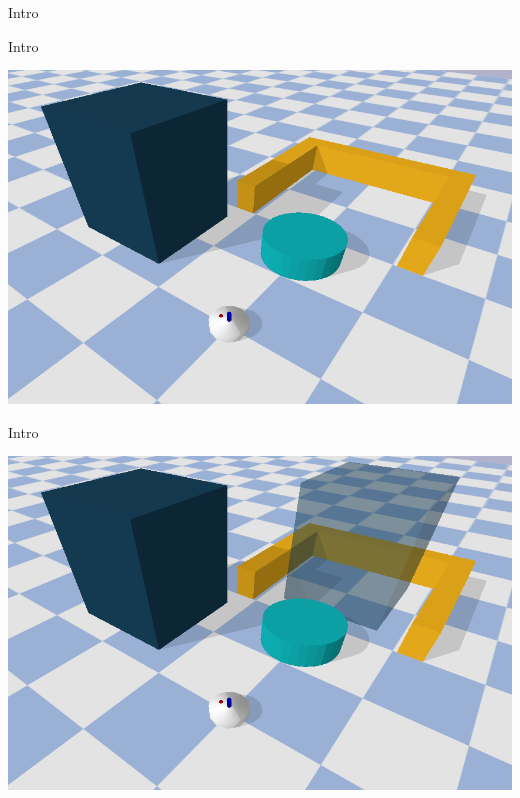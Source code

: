 \begin{frame}[c]{Intro} 
  \begin{center}
  
  \end{center}
\end{frame}

\begin{frame}[fragile]{Intro}
\vspace{-0.7cm}
\begin{center}
\includegraphics[height=0.9\textheight]{figures/introduction/blockade}
\end{center}
\end{frame}

\begin{frame}[fragile]{Intro}
\vspace{-0.7cm}
\begin{center}
\includegraphics[height=0.9\textheight]{figures/introduction/blockade_with_target}
\end{center}
\end{frame}

